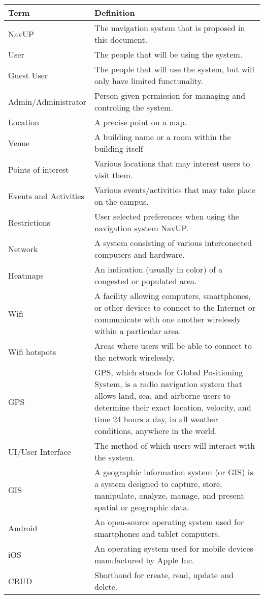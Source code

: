 \begin{center}
    \begin{tabular}{| l | p{8cm} |}
    \hline
    \textbf{Term} & \textbf{Definition} \\ \hline
	NavUP & The navigation system that is proposed in this document. \\ \hline
	User & The people that will be using the system. \\ \hline
	Guest User & The people that will use the system, but will only have limited functunality. \\ \hline
	Admin/Administrator & Person given permission for managing and controling the system. \\ \hline
	Location & A precise point on a map. \\ \hline
	Venue & A building name or a room within the building itself \\ \hline
	Points of interest & Various locations that may interest users to visit them. \\ \hline
	Events and Activities & Various events/activities that may take place on the campus. \\ \hline
	Restrictions & User selected preferences when using the navigation system NavUP. \\ \hline
	Network & A system consisting of various interconected computers and hardware. \\ \hline
	Heatmaps & An indication (usually in color) of a congested or populated area. \\ \hline
	Wifi & A facility allowing computers, smartphones, or other devices to connect to the Internet or communicate with one another wirelessly within a particular area. \\ \hline
	Wifi hotspots & Areas where users will be able to connect to the network wirelessly. \\ \hline    
	GPS & GPS, which stands for Global Positioning System, is a radio navigation system that allows land, sea, and airborne users to determine their exact location, velocity, and time 24 hours a day, in all weather conditions, anywhere in the world. \\ \hline
	UI/User Interface & The method of which users will interact with the system. \\ \hline
	GIS & A geographic information system (or GIS) is a system designed to capture, store, manipulate, analyze, manage, and present spatial or geographic data. \\ \hline
	Android & An open-source operating system used for smartphones and tablet computers. \\ \hline
	iOS & An operating system used for mobile devices manufactured by Apple Inc. \\ \hline
  CRUD & Shorthand for create, read, update and delete. \\ \hline
    \end{tabular}
\end{center}
